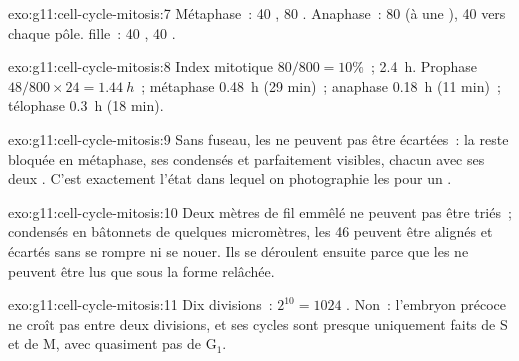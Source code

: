 \begin{solution}{exo:g11:cell-cycle-mitosis:7}
Métaphase~: 40 , 80 . Anaphase~: 80 
(à une ), 40 vers chaque pôle.  fille~: 40
, 40 .
\end{solution}

\begin{solution}{exo:g11:cell-cycle-mitosis:8}
Index mitotique $80/800 = 10\%$~;  \qty{2.4}{h}. Prophase
$48/800 \times 24 = \qty{1.44}{h}$~; métaphase \qty{0.48}{h}
(29 min)~; anaphase \qty{0.18}{h} (11 min)~; télophase \qty{0.3}{h}
(18 min).
\end{solution}

\begin{solution}{exo:g11:cell-cycle-mitosis:9}
Sans fuseau, les  ne peuvent pas être écartées~: la 
reste bloquée en métaphase, ses  condensés et parfaitement
visibles, chacun avec ses deux . C'est exactement l'état
dans lequel on photographie les  pour un .
\end{solution}

\begin{solution}{exo:g11:cell-cycle-mitosis:10}
Deux mètres de fil emmêlé ne peuvent pas être triés~; condensés en
bâtonnets de quelques micromètres, les 46  peuvent être
alignés et écartés sans se rompre ni se nouer. Ils se déroulent ensuite
parce que les  ne peuvent être lus que sous la forme relâchée.
\end{solution}

\begin{solution}{exo:g11:cell-cycle-mitosis:11}
Dix divisions~: $2^{10} = 1024$ . Non~: l'embryon précoce ne
croît pas entre deux divisions, et ses cycles sont presque uniquement
faits de S et de M, avec quasiment pas de $\mathrm{G_1}$.
\end{solution}

